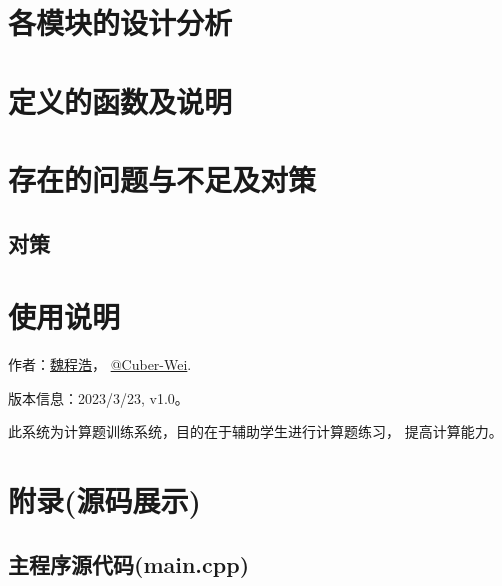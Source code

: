 \documentclass[a4paper]{article}
\begin{document}
\sectionbreak
\section{各模块的设计分析}
\sectionbreak
\section{定义的函数及说明}

\sectionbreak
\section{存在的问题与不足及对策}
\subsection*{对策}

\sectionbreak
\section{使用说明}
\begin{description}
    \seccontent
    \item[程序信息]
        作者：\href{https://www.cnblogs.com/Lovechan/}{魏程浩}，
        \href{https://github.com/Cuber-Wei}{@Cuber-Wei}.

        版本信息：2023/3/23, v1.0。

    \item[系统简介]
        此系统为计算题训练系统，目的在于辅助学生进行计算题练习，
        提高计算能力。

\end{description}

\sectionbreak
\clearpage
\appendix
{}
{}
\section*{附录(源码展示)}
\renewcommand{\thesubsection}{\thesection\Alph{subsection}}

\subsection{主程序源代码(main.cpp)}
\end{document}
